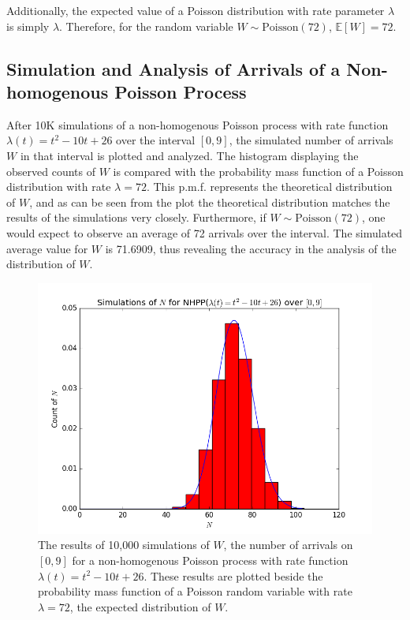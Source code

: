 \documentclass[11pt, oneside]{article}   	%
\begin{document}
Additionally, the expected value of a Poisson distribution with rate parameter $\lambda$ is simply $\lambda$. Therefore, for the random variable $W \sim \text{Poisson}(72)$, $\mathbb{E}[W]=72$.

\subsection{Simulation and Analysis of Arrivals of a Non-homogenous Poisson Process}
After 10K simulations of a non-homogenous Poisson process with rate function $\lambda(t) =t^2-10t+26$ over the interval $[0,9]$, the simulated number of arrivals $W$ in that interval is plotted and analyzed. The histogram displaying the observed counts of $W$ is compared with the probability mass function of a Poisson distribution with rate $\lambda = 72$. This p.m.f. represents the theoretical distribution of $W$, and as can be seen from the plot the theoretical distribution matches the results of the simulations very closely. Furthermore, if $W \sim \text{Poisson}(72)$, one would expect to observe an average of 72 arrivals over the interval. The simulated average value for $W$ is 71.6909, thus revealing the accuracy in the analysis of the distribution of $W$.
\begin{figure}[H]
\includegraphics[scale=.5]{nhpp_n}
\caption{The results of 10,000 simulations of $W$, the number of arrivals on $[0,9]$ for a non-homogenous Poisson process with rate function $\lambda(t)=t^2-10t+26$. These results are plotted beside the probability mass function of a Poisson random variable with rate $\lambda=72$, the expected distribution of $W$.}
\label{fig:x}
\end{figure}
\end{document}
